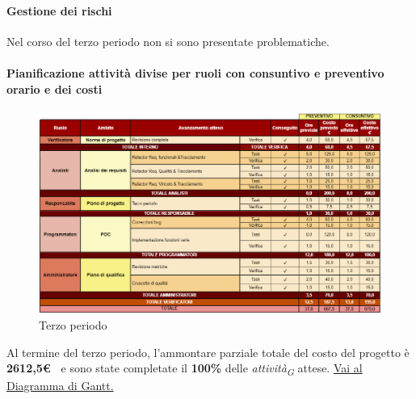 \paragraph{Gestione dei rischi} 

Nel corso del terzo periodo non si sono presentate problematiche.

\newpage
\paragraph{Pianificazione attività divise per ruoli con consuntivo e preventivo orario e dei costi}\hspace{1pt}

\begin{figure}[H]
    \centering
    \includegraphics[width=\linewidth, height=0.9\textheight, keepaspectratio]{../Images/periodo3.PNG}
    \caption{Terzo periodo}
    \label{fig:Terzo_periodo}
\end{figure}


Al termine del terzo periodo, l'ammontare parziale totale del costo del progetto è \textbf{ 2612,5\euro\ } e sono state completate il \textbf{100\%} delle \textit{attività}\textsubscript{\textit{G}} attese.
\href{https://github.com/orgs/ByteOps-swe/projects/3/views/1?sortedBy%5Bdirection%5D=asc&sortedBy%5BcolumnId%5D=64182560}{Vai al Diagramma di Gantt.}\hspace{1pt}


